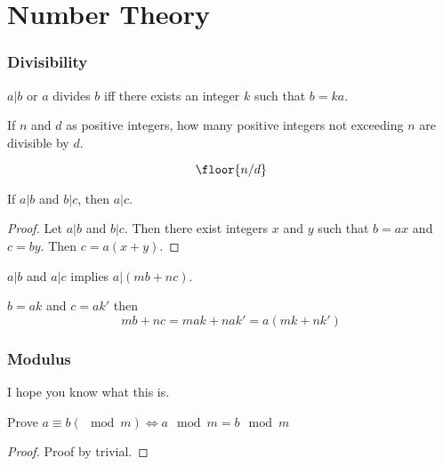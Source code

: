 \documentclass{scrreprt}
\begin{document}
\chapter{Number Theory}

\subsection{Divisibility}

\begin{definition}
	$a|b$ or $a$ divides $b$ iff there exists an integer $k$ such that $b=ka$.
\end{definition}

\begin{example}
	If $n$ and $d$ as positive integers, how many positive integers not exceeding $n$ are divisible by $d$.

	\[
		\floor{n/d}
	\]
\end{example}

\begin{example}
	If $a|b$ and $b|c$, then $a|c$.

	\begin{proof}
		Let $a|b$ and $b|c$. Then there exist integers $x$ and $y$ such that $b = ax$ and $c = by$. Then $c = a(x+y)$.
	\end{proof}
\end{example}

\begin{example}
	$a|b$ and $a|c$ implies $a|(mb + nc)$.

	$b=ak$ and $c=ak'$ then \[
		mb+nc=mak+nak'=a(mk+nk')
	\]
\end{example}

\subsection{Modulus}

I hope you know what this is.

\begin{example}
	Prove $a\equiv b (\mod m)\iff a\mod m = b \mod m$

	\begin{proof}
		Proof by trivial.
	\end{proof}
\end{example}
\end{document}
